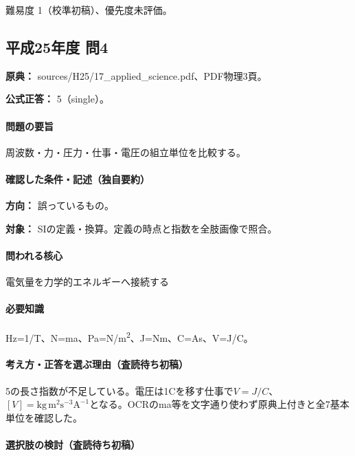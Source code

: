 \par 難易度 1（校準初稿）、優先度未評価。

\subsection{平成25年度 問4}
\label{q:h25-reg-applied-04}

\noindent\textbf{原典：} sources/H25/17\_applied\_science.pdf、PDF物理3頁。

\textbf{公式正答：} 5（single）。

\paragraph{問題の要旨} 周波数・力・圧力・仕事・電圧の組立単位を比較する。

\paragraph{確認した条件・記述（独自要約）}\mbox{}\par

\noindent\textbf{方向：} 誤っているもの。\par

\noindent\textbf{対象：} SIの定義・換算。定義の時点と指数を全肢画像で照合。\par

\paragraph{問われる核心} 電気量を力学的エネルギーへ接続する

\paragraph{必要知識} Hz=\allowbreak{}1/T、N=\allowbreak{}ma、Pa=\allowbreak{}N/m\textsuperscript{2}、J=\allowbreak{}Nm、C=\allowbreak{}As、V=\allowbreak{}J/C。

\paragraph{考え方・正答を選ぶ理由（査読待ち初稿）} 5の長さ指数が不足している。電圧は1Cを移す仕事で\(V=J/C\)、\([V]=\mathrm{kg\,m^2s^{-3}A^{-1}}\)となる。OCRのma等を文字通り使わず原典上付きと全7基本単位を確認した。

\paragraph{選択肢の検討（査読待ち初稿）}\mbox{}\par

